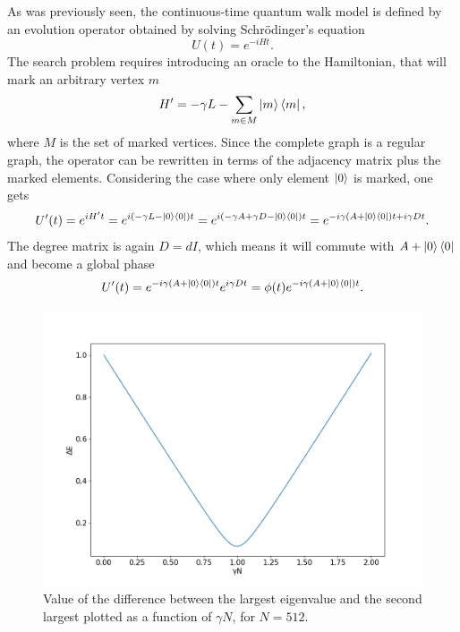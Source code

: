 \documentclass[../../dissertation.tex]{subfiles}
\begin{document}
As was previously seen, the continuous-time quantum walk model is defined by an
evolution operator obtained by solving Schrödinger's equation
\begin{equation}
	U(t) = e^{-iHt}.
\end{equation}
The search problem requires introducing an oracle to the Hamiltonian, that will
mark an arbitrary vertex $m$ 
\begin{equation}
	H' = -\gamma L - \sum_{m \in M}\ket{m}\bra{m},
\end{equation}
where $M$ is the set of marked vertices. Since the complete graph is a regular
graph, the operator can be rewritten in terms of the adjacency matrix plus the
marked elements. Considering the case where only element $\ket{0}$ is marked,
one gets
\begin{equation}
	U'(t) = e^{iH't} = e^{i(-\gamma L - \ket{0}\bra{0})t} = e^{i(-\gamma A + \gamma D - \ket{0}\bra{0})t} = e^{-i\gamma(A+\ket{0}\bra{0})t + i\gamma D t}.
\end{equation}
The degree matrix is again $D=dI$, which means it will commute with
$A+\ket{0}\bra{0}$ and become a global phase
\begin{equation}
	U'(t) = e^{-i\gamma(A+\ket{0}\bra{0})t}e^{i\gamma D t} = \phi(t)e^{-i\gamma(A+\ket{0}\bra{0})t}.
\end{equation}
\begin{figure}[h]
	\centering \includegraphics[scale=0.40]{img/ContQuantumWalk/Search/gamma512.png}
	\caption{Value of the difference between the largest eigenvalue and the second largest plotted as a function of $\gamma N$, for $N=512$.}
	\label{fig:gamma512}
\end{figure}\par
\end{document}
